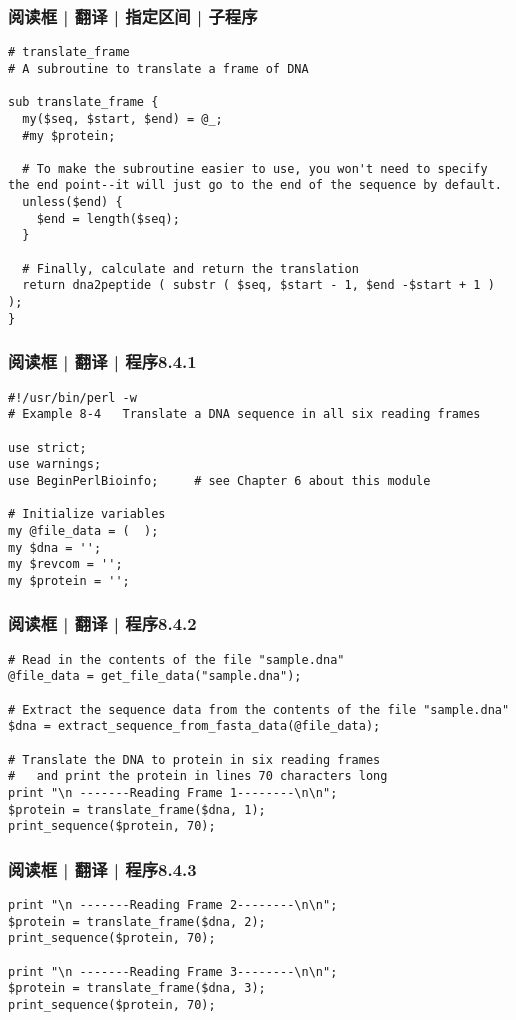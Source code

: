 \begin{frame}[fragile]
  \frametitle{阅读框 | 翻译 | 指定区间 | \alert{子程序}}
\begin{lstlisting}[basicstyle=\footnotesize\tt,numberstyle=\scriptsize]
# translate_frame
# A subroutine to translate a frame of DNA

sub translate_frame {
  my($seq, $start, $end) = @_;
  #my $protein;

  # To make the subroutine easier to use, you won't need to specify the end point--it will just go to the end of the sequence by default.
  unless($end) {
    $end = length($seq);
  }

  # Finally, calculate and return the translation
  return dna2peptide ( substr ( $seq, $start - 1, $end -$start + 1 ) );
}
\end{lstlisting}
\end{frame}

\begin{frame}[fragile]
  \frametitle{阅读框 | 翻译 | 程序8.4.1}
\begin{lstlisting}[firstnumber=1]
#!/usr/bin/perl -w
# Example 8-4   Translate a DNA sequence in all six reading frames

use strict;
use warnings;
use BeginPerlBioinfo;     # see Chapter 6 about this module

# Initialize variables
my @file_data = (  );
my $dna = '';
my $revcom = '';
my $protein = '';
\end{lstlisting}
\end{frame}

\begin{frame}[fragile]
  \frametitle{阅读框 | 翻译 | 程序8.4.2}
\begin{lstlisting}[firstnumber=14,basicstyle=\small\tt,numberstyle=\footnotesize]
# Read in the contents of the file "sample.dna"
@file_data = get_file_data("sample.dna");

# Extract the sequence data from the contents of the file "sample.dna"
$dna = extract_sequence_from_fasta_data(@file_data);

# Translate the DNA to protein in six reading frames
#   and print the protein in lines 70 characters long
print "\n -------Reading Frame 1--------\n\n";
$protein = translate_frame($dna, 1);
print_sequence($protein, 70);
\end{lstlisting}
\end{frame}

\begin{frame}[fragile]
  \frametitle{阅读框 | 翻译 | 程序8.4.3}
\begin{lstlisting}[firstnumber=26]
print "\n -------Reading Frame 2--------\n\n";
$protein = translate_frame($dna, 2);
print_sequence($protein, 70);

print "\n -------Reading Frame 3--------\n\n";
$protein = translate_frame($dna, 3);
print_sequence($protein, 70);
\end{lstlisting}
\end{frame}

